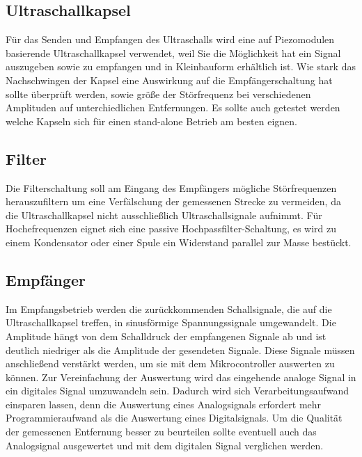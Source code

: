 \subsection{Ultraschallkapsel}
Für das Senden und Empfangen des Ultraschalls wird eine auf Piezomodulen basierende Ultraschallkapsel verwendet, weil Sie die Möglichkeit hat ein Signal auszugeben sowie zu empfangen und in Kleinbauform erhältlich ist. Wie stark das Nachschwingen der Kapsel eine Auswirkung auf die Empfängerschaltung hat sollte überprüft werden, sowie größe der Störfrequenz bei verschiedenen Amplituden auf unterchiedlichen Entfernungen. Es sollte auch getestet werden welche Kapseln sich für einen stand-alone Betrieb am besten eignen.

\subsection{Filter}
Die Filterschaltung soll am Eingang des Empfängers mögliche Störfrequenzen herauszufiltern um eine Verfälschung der gemessenen Strecke zu vermeiden, da die Ultraschallkapsel nicht ausschließlich Ultraschallsignale aufnimmt. Für Hochefrequenzen eignet sich eine passive Hochpassfilter-Schaltung, es wird zu einem Kondensator oder einer Spule ein Widerstand parallel zur Masse bestückt. 

\subsection{Empfänger}
Im Empfangsbetrieb werden die zurückkommenden Schallsignale, die auf die Ultraschallkapsel treffen, in sinusförmige Spannungssignale umgewandelt. Die Amplitude hängt von dem Schalldruck der empfangenen Signale ab und ist deutlich niedriger als die Amplitude der gesendeten Signale. Diese Signale müssen anschließend verstärkt werden, um sie mit dem Mikrocontroller auswerten zu können. Zur Vereinfachung der Auswertung wird das eingehende analoge Signal in ein digitales Signal umzuwandeln sein. Dadurch wird sich Verarbeitungsaufwand einsparen lassen, denn die Auswertung eines Analogsignals erfordert mehr Programmieraufwand als die Auswertung eines Digitalsignals. Um die Qualität der gemessenen Entfernung besser zu beurteilen sollte eventuell auch das Analogsignal ausgewertet und mit dem digitalen Signal verglichen werden. 












